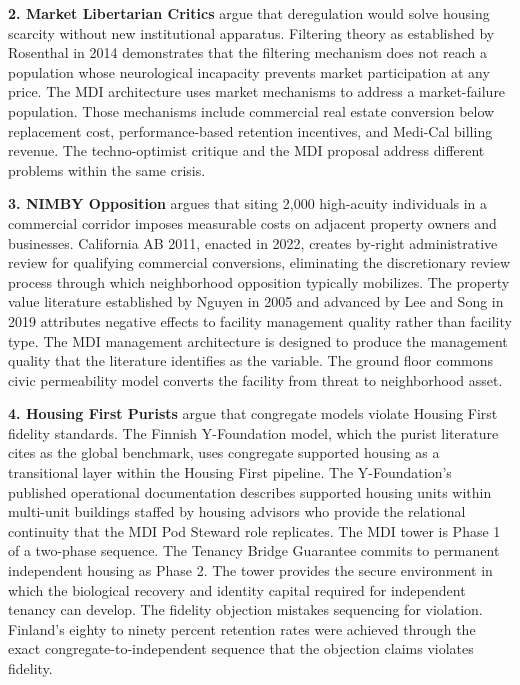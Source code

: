 \documentclass[12pt, letterpaper]{article}
\begin{document}
\textbf{2. Market Libertarian Critics} argue that deregulation would solve housing scarcity without new institutional apparatus. Filtering theory as established by Rosenthal in 2014 demonstrates that the filtering mechanism does not reach a population whose neurological incapacity prevents market participation at any price. The MDI architecture uses market mechanisms to address a market-failure population. Those mechanisms include commercial real estate conversion below replacement cost, performance-based retention incentives, and Medi-Cal billing revenue. The techno-optimist critique and the MDI proposal address different problems within the same crisis.

\textbf{3. NIMBY Opposition} argues that siting 2,000 high-acuity individuals in a commercial corridor imposes measurable costs on adjacent property owners and businesses. California AB 2011, enacted in 2022, creates by-right administrative review for qualifying commercial conversions, eliminating the discretionary review process through which neighborhood opposition typically mobilizes. The property value literature established by Nguyen in 2005 and advanced by Lee and Song in 2019 attributes negative effects to facility management quality rather than facility type. The MDI management architecture is designed to produce the management quality that the literature identifies as the variable. The ground floor commons civic permeability model converts the facility from threat to neighborhood asset.

\textbf{4. Housing First Purists} argue that congregate models violate Housing First fidelity standards. The Finnish Y-Foundation model, which the purist literature cites as the global benchmark, uses congregate supported housing as a transitional layer within the Housing First pipeline. The Y-Foundation's published operational documentation describes supported housing units within multi-unit buildings staffed by housing advisors who provide the relational continuity that the MDI Pod Steward role replicates. The MDI tower is Phase 1 of a two-phase sequence. The Tenancy Bridge Guarantee commits to permanent independent housing as Phase 2. The tower provides the secure environment in which the biological recovery and identity capital required for independent tenancy can develop. The fidelity objection mistakes sequencing for violation. Finland's eighty to ninety percent retention rates were achieved through the exact congregate-to-independent sequence that the objection claims violates fidelity.
\end{document}

